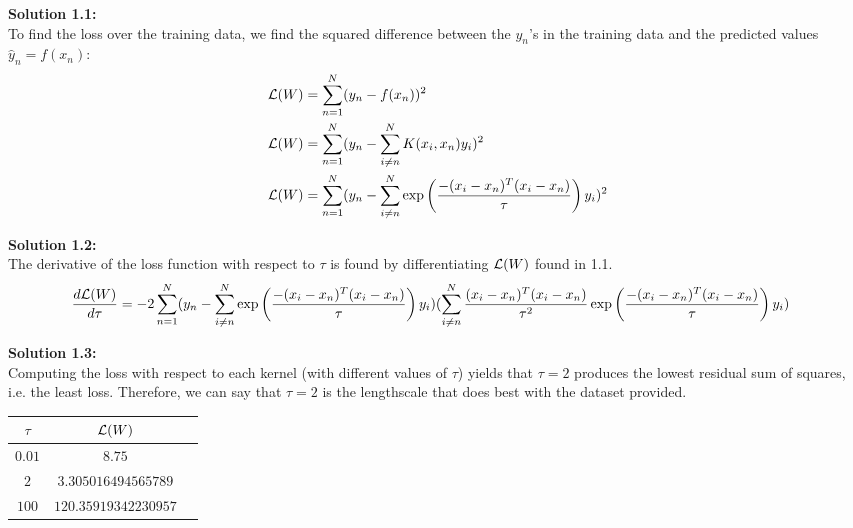 \documentclass[submit]{harvardml}
\begin{document}
\newpage

\noindent\textbf{Solution 1.1:}\\
To find the loss over the training data, we find the squared difference between the $y_n$'s in the training data and the predicted values $\hat{y}_n = f(x_n)$:
\begin{align*}
    \mathcal{L}(W) &= \sum_{n=1}^{N} (y_n - f(x_n))^2\\
    \mathcal{L}(W) &= \sum_{n=1}^{N} (y_n - \sum_{i\ne n}^{N}K(x_i,x_n)y_i)^2\\
    \mathcal{L}(W) &= \sum_{n=1}^{N} (y_n - \sum_{i\ne n}^{N}\exp\left(\frac{-(x_i-x_n)^T (x_i-x_n)}{\tau} \right) y_i)^2
\end{align*}

\bigskip
\noindent\textbf{Solution 1.2:}\\
The derivative of the loss function with respect to $\tau$ is found by differentiating $\mathcal{L}(W)$ found in 1.1.
\begin{align*}
    \frac{d\mathcal{L}(W)}{d\tau} &= -2 \sum_{n=1}^{N} (y_n - \sum_{i\ne n}^{N} \exp\left(\frac{-(x_i-x_n)^T (x_i-x_n)}{\tau} \right) y_i) (\sum_{i\ne n}^{N} \frac{(x_i-x_n)^T (x_i-x_n)}{\tau^2} \exp\left(\frac{-(x_i-x_n)^T (x_i-x_n)}{\tau} \right) y_i)
\end{align*}

\bigskip
\noindent\textbf{Solution 1.3:}\\
Computing the loss with respect to each kernel (with different values of $\tau$) yields that $\tau = 2$ produces the lowest residual sum of squares, i.e. the least loss. Therefore, we can say that $\tau = 2$ is the lengthscale that does best with the dataset provided.
\begin{center}
\begin{tabular}{ |c|c|c| } 
 \hline
 $\tau$ & $\mathcal{L}(W)$ \\ 
 \hline\hline
 $0.01$ & $8.75$ \\
 \hline
 $2$ & $3.305016494565789$ \\ 
 \hline
 $100$ & $120.35919342230957$ \\ 
 \hline
\end{tabular}
\end{center}
\end{document}
